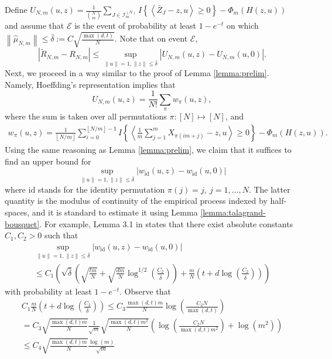 \documentclass[12pt]{article}
\newcommand{\wh}{\widehat}
\def\l{\left}
\def\r{\right}
\newcommand{\m}{\mathcal}
\newcommand{\dotp}[2]{\left\langle#1,#2\right\rangle}
\theoremstyle{thmstyletwo}%
\theoremstyle{thmstylethree}%
\begin{document}
Define $U_{N,m}(u,z) =  \frac{1}{{N\choose m}} \sum_{J\in \m I_{m}^{(N)} }I\left\{ \dotp{\bar Z_J-z}{u}\geq 0\right\} - \Phi_m\l( H(z,u)\r)$ and assume that $\m E$ is the event of probability at least $1-e^{-t}$ on which $\l\|\wh\mu_{N,m}\r\|\leq \bar\delta:=C\sqrt{\frac{\max(d,t)}{N}}$. Note that on event $\m E$, 
\[
\l|\tilde R_{N,m}-R_{N,m}\r| \leq \sup_{\|u\|=1,\|z\|\leq \bar \delta}\l| U_{N,m}(u,z) - U_{N,m}(u,0) \r|.
\]
Next, we proceed in a way similar to the proof of Lemma \ref{lemma:prelim}. Namely, Hoeffding's representation implies that
\[
U_{N,m}(u,z) =  \frac{1}{N!} \sum_\pi w_{\pi}(u,z),
\]
where the sum is taken over all permutations $\pi: [N] \mapsto [N]$, and
\begin{align*}
        w_{\pi}(u,z) = \frac{1}{\l\lfloor N/m \r\rfloor}\sum_{i=0}^{\l\lfloor N/m \r\rfloor-1} I\left\{ \dotp{\frac{1}{m}\sum_{j=1}^m X_{\pi(im+j)} - z}{u}\geq 0\right\} - \Phi_m\l( H(z,u)\r).
\end{align*}
Using the same reasoning as Lemma \ref{lemma:prelim}, we claim that it suffices to find an upper bound for 
\[
\sup_{\|u\|=1,\|z\|\leq \bar \delta}\l| w_{\mathrm{id}}(u,z) - w_{\mathrm{id}}(u,0)\r|
\]
where $\mathrm{id}$ stands for the identity permutation $\pi(j)=j, \ j=1,\ldots,N$. 
The latter quantity is the modulus of continuity of the empirical process indexed by half-spaces, and it is standard to estimate it using Lemma \ref{lemma:talagrand-bousquet}. For example, Lemma 3.1 in \citep[][]{minsker2024improved} states that there exist absolute constants $C_1,C_2>0$ such that 
    \begin{multline*}
        \sup\limits_{\|u\|=1,\|z\|\leq \bar \delta} \l| w_{\mathrm{id}}(u,z) - w_{\mathrm{id}}(u,0)\r|
        \\
        \leq C_1\l( \sqrt{\bar\delta}\l(\sqrt{\frac{tm}{N}}+\sqrt{\frac{dm}{N}}\log^{1/2}\l( \frac{C_2}{\bar\delta}\r)\r) + \frac{m}{N}\l( t+d\log\l( \frac{C_2}{\bar\delta}\r)\r)\r)
    \end{multline*}
with probability at least $1-e^{-t}$. Observe that 
\begin{multline*}
C_1\frac{m}{N}\l( t+d\log\l( \frac{C_2}{\bar\delta}\r)\r) \leq 
C_3 \frac{\max(d,t)m}{N} \log\l(\frac{C_2N }{\max(d,t)}\r)
\\
= C_3\sqrt{\frac{\max(d,t)m}{N}} \frac{1}{\sqrt{m}} \sqrt{\frac{\max(d,t)m^2}{N} }\l(\log\l(\frac{C_2N }{\max(d,t)m^2}\r)+ \log(m^2)\r)
\\
\leq C_4 \sqrt{\frac{\max(d,t)m}{N}}\frac{\log(m)}{\sqrt m}
\end{multline*}
\end{document}
